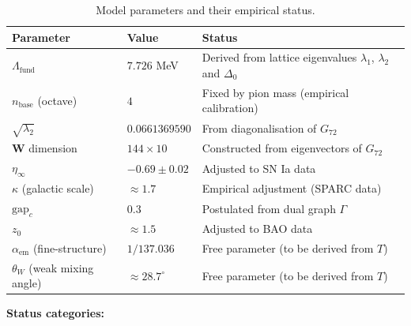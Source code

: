 \documentclass[11pt]{article}
\begin{document}
\begin{table}[htbp]
\centering
\caption{Model parameters and their empirical status.}
\label{tab:parameters_appendix}
\begin{tabular}{@{}lll@{}}
\toprule
\textbf{Parameter} & \textbf{Value} & \textbf{Status} \\
\midrule
$\Lambda_{\text{fund}}$ & $7.726$ MeV & Derived from lattice eigenvalues $\lambda_1$, $\lambda_2$ and $\Delta_0$ \\
$n_{\text{base}}$ (octave) & $4$ & Fixed by pion mass (empirical calibration) \\
$\sqrt{\lambda_2}$ & $0.0661369590$ & From diagonalisation of $G_{72}$ \\
$\mathbf{W}$ dimension & $144 \times 10$ & Constructed from eigenvectors of $G_{72}$ \\
$\eta_\infty$ & $-0.69 \pm 0.02$ & Adjusted to SN Ia data \\
$\kappa$ (galactic scale) & $\approx 1.7$ & Empirical adjustment (SPARC data) \\
$\text{gap}_c$ & $0.3$ & Postulated from dual graph $\Gamma$ \\
$z_0$ & $\approx 1.5$ & Adjusted to BAO data \\
$\alpha_{\text{em}}$ (fine-structure) & $1/137.036$ & Free parameter (to be derived from $T$) \\
$\theta_W$ (weak mixing angle) & $\approx 28.7^\circ$ & Free parameter (to be derived from $T$) \\
\bottomrule
\end{tabular}
\end{table}

\textbf{Status categories:}
\end{document}
